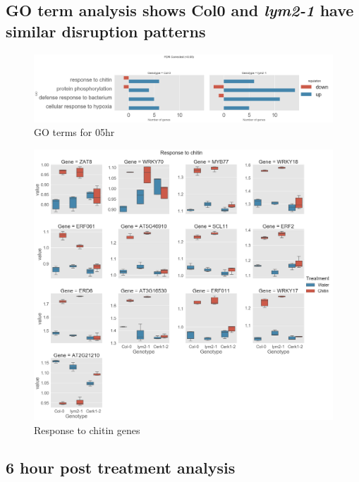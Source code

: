 \documentclass[../main.tex]{subfiles}
\begin{document}
\subsection{GO term analysis shows Col0 and \textit{lym2-1} have similar
  disruption patterns}


\begin{figure}[ht]
  \centering
  \includegraphics[width=\columnwidth]{figures/05hrGO.png}
  \caption{\label{fig:05hrGO} GO terms for 05hr}
\end{figure}



\begin{figure}[ht]
  \centering
  \includegraphics[width=\textwidth, height=\textheight, keepaspectratio]{figures/response to chitin.png}
  \caption{\label{fig:respchitin} Response to chitin genes}
\end{figure}




\subsection{6 hour post treatment analysis}
\label{subsec:deg6}
\end{document}

